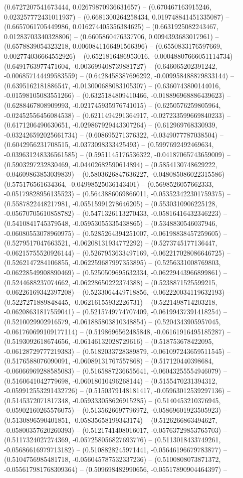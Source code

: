 (0.6727207541673444, 0.02679870936631657) -- (0.670467163915246, 0.023257772431011937) -- (0.6681300264258434, 0.019748841451335087) -- (0.6657061705449986, 0.016274405356384625) -- (0.6631925082243467, 0.01283703340328806) -- (0.6605860476337706, 0.0094393683017961) -- (0.6578839054323218, 0.0060841166491566396) -- (0.6550833176597669, 0.002774036664552926) -- (0.6521816486953016, -0.00048807666051114734) -- (0.6491763977471604, -0.003699408739881727) -- (0.646065202391242, -0.006857144499583559) -- (0.6428458387696292, -0.009958488879833144) -- (0.6395162181886547, -0.013000688083105307) -- (0.6360743800144016, -0.01598105083551266) -- (0.6325184809410466, -0.018896968886439623) -- (0.6288467808909993, -0.021745935976741015) -- (0.6250576259805964, -0.02452556456084538) -- (0.6211494291364917, -0.027233599669840233) -- (0.6171206490630651, -0.029867929443307264) -- (0.612969768330939, -0.032426592025661734) -- (0.608695271376322, -0.0349077787038504) -- (0.6042956231708515, -0.0373098333425493) -- (0.5997692492469634, -0.039631248336561585) -- (0.5951145176536322, -0.04187065743659009) -- (0.5903297232830469, -0.04402682590614894) -- (0.5854130748629222, -0.04609863853039839) -- (0.5803626847636227, -0.048085086022315586) -- (0.575176561634364, -0.04998525036143401) -- (0.5698526057662333, -0.05179828956135523) -- (0.5643886069866011, -0.053523422301759375) -- (0.5587822448217981, -0.05515991278646205) -- (0.5530310906225128, -0.05670705610858782) -- (0.5471326113270433, -0.05816416432346223) -- (0.5410841745379548, -0.05953055335438865) -- (0.5348830546037946, -0.06080553078960975) -- (0.5285264394251007, -0.06198838457259605) -- (0.5279517047663521, -0.06208131934772292) -- (0.5273745177136447, -0.06215755520926144) -- (0.5267953633497169, -0.062217028086646725) -- (0.5262147284106855, -0.062259687997353895) -- (0.5256331008769803, -0.06228549908890469) -- (0.5250509695632334, -0.06229443966899861) -- (0.5244688237074662, -0.06228650222374388) -- (0.5238871525599215, -0.06226169342397208) -- (0.5233064449718856, -0.062220034119632193) -- (0.5227271889848445, -0.06216155932226731) -- (0.5221498714203218, -0.06208631817559041) -- (0.5215749774707409, -0.06199437391418254) -- (0.5210029902916579, -0.061885803810348854) -- (0.5204343905957045, -0.061760699109177114) -- (0.5198696562485848, -0.06161916495185287) -- (0.5193092618674656, -0.06146132028729616) -- (0.518753678422095, -0.06128729777219383) -- (0.5182033728389879, -0.061097243659511545) -- (0.5176588076090091, -0.06089131767557868) -- (0.517120440398684, -0.06066969288585083) -- (0.5165887236655641, -0.06043255554946079) -- (0.5160641042779698, -0.06018010496268144) -- (0.5155470231394312, -0.059912553291432726) -- (0.5150379148181417, -0.05963012539297136) -- (0.5145372071817348, -0.059333058626915285) -- (0.5140453210376945, -0.05902160265576075) -- (0.5135626697796972, -0.05869601923505923) -- (0.5130896590401851, -0.05835658199343174) -- (0.5126266863494627, -0.05800357620260393) -- (0.5121741408016017, -0.05763729853765703) -- (0.5117324027274369, -0.057258056827693776) -- (0.5113018433749261, -0.05686616979713182) -- (0.5108828245971441, -0.05646196679783877) -- (0.5104756985481718, -0.056045787532337236) -- (0.5100808073871372, -0.055617981768309364) -- (0.509698482990656, -0.05517890904464397) -- 